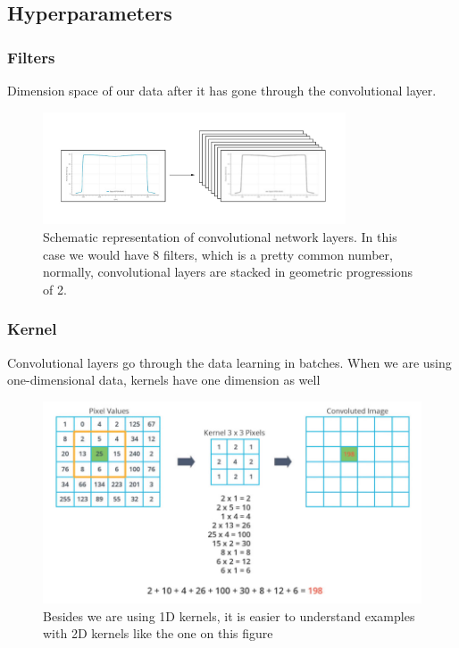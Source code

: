 \documentclass[openany]{article}
\begin{document}
\subsection{Hyperparameters}

\subsubsection*{Filters}

Dimension space of our data after it has gone through the convolutional layer.

\begin{figure}[!h]
    \centering
    \includegraphics[width=0.8\textwidth]{Filters.jpeg}
    \caption{Schematic representation of convolutional network layers. In this case we would have 8 filters, which is a pretty common number, normally, convolutional layers are stacked in geometric progressions of 2.}
    \label{fig:my_label}
\end{figure}

\subsubsection*{Kernel}
Convolutional layers go through the data learning in batches. When we are using one-dimensional data, kernels have one dimension as well

\begin{figure}[!h]
    \centering
    \includegraphics[width=\textwidth]{Kernel.png}
    \caption{Besides we are using 1D kernels, it is easier to understand examples with 2D kernels like the one on this figure}
    \label{fig:my_label}
\end{figure}
\end{document}
